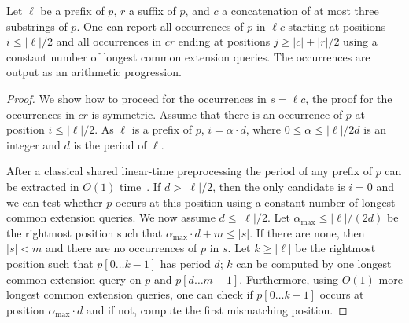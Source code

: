 \begin{proposition}\label{claim:big_overlap}
Let $\ell$ be a prefix of $p$, $r$ a suffix of $p$, and $c$ a concatenation of at most three substrings of $p$. One can report all occurrences of $p$ in $\ell c$ starting at positions $i \leq |\ell|/2$ and all occurrences in $cr$ ending at positions $j \geq |c|+|r|/2$ using a constant number of longest common extension queries.
%
The occurrences are output as an arithmetic progression.
\end{proposition}
\begin{proof}
We show how to proceed for the occurrences in $s = \ell c$, the proof for the occurrences in $c r$ is symmetric. Assume that there is an occurrence of $p$ at position $i \leq |\ell|/2$. As $\ell$ is a prefix of $p$, $i= \alpha \cdot d$, where $0 \leq \alpha \leq |\ell|/2d$ is an integer and $d$ is the period of $\ell$. 

After a classical shared linear-time preprocessing the period of any prefix of $p$ can be extracted in $O(1)$ time~\cite{JoC/KnuthMorrisPratt}. If $d >|\ell|/2$, then the only candidate is $i=0$ and we can test whether $p$ occurs at this position using a constant number of longest common extension queries.
We now assume $d \leq |\ell|/2$. Let $\alpha_{\max} \leq |\ell|/(2d)$ be the rightmost position such that $\alpha_{\max} \cdot d +m \leq |s|$. If there are none, then $|s| < m$ and there are no occurrences of $p$ in $s$. Let $k \geq |\ell|$ be the rightmost position such that $p[0 \dots k-1]$ has period $d$; $k$ can be computed by one longest common extension query on $p$ and $p[d \dots m-1]$. Furthermore, using $O(1)$ more longest common extension queries, one can check if $p[0 \dots k-1]$ occurs at position $\alpha_{\max} \cdot d$ and if not, compute the first mismatching position.


\end{proof}
